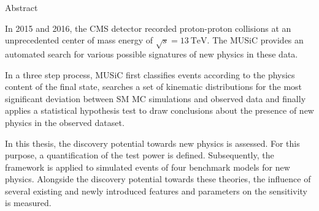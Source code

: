 
{Abstract}
\chapterheadendvskip

In 2015 and 2016, the \acs{CMS} detector recorded proton-proton collisions at an unprecedented center of mass energy of $\sqrt{s} = \SI{13}{\TeV}$. The \acf{MUSiC} provides an automated search for various possible signatures of new physics in these data.

In a three step process, \acs{MUSiC} first classifies events according to the physics content of the final state, searches a set of kinematic distributions for the most significant deviation between \acl{SM} \acl{MC} simulations and observed data and finally applies a statistical hypothesis test to draw conclusions about the presence of new physics in the observed dataset.

In this thesis, the discovery potential towards new physics is assessed. For this purpose, a quantification of the test power is defined. Subsequently, the framework is applied to simulated events of four benchmark models for new physics. Alongside the discovery potential towards these theories, the influence of several existing and newly introduced features and parameters on the sensitivity is measured.
